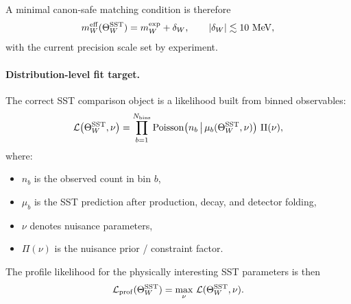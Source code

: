 \documentclass[11pt]{article}
\theoremstyle{definition}
\theoremstyle{plain}
\theoremstyle{remark}
\begin{document}
            A minimal canon-safe matching condition is therefore
            \begin{equation}
                m_W^{\rm eff}(\Theta_W^{\rm SST}) = m_W^{\rm exp} + \delta_W,
                \qquad
                |\delta_W| \lesssim 10~{\rm MeV},
                \label{eq:mw-match}
            \end{equation}
            with the current precision scale set by experiment.
    
        \paragraph{Distribution-level fit target.}
            The correct SST comparison object is a likelihood built from binned observables:
            \begin{equation}
                \mathcal{L}\bigl(\Theta_W^{\rm SST},\nu\bigr)
                =
                \prod_{b=1}^{N_{\rm bins}}
                    {\rm Poisson}\!\left(
                                       n_b \,\middle|\, \mu_b(\Theta_W^{\rm SST},\nu)
                \right)
                \,
                \Pi(\nu),
                \label{eq:sst-likelihood}
            \end{equation}
            where:
            \begin{itemize}
                \item $n_b$ is the observed count in bin $b$,
                \item $\mu_b$ is the SST prediction after production, decay, and detector folding,
                \item $\nu$ denotes nuisance parameters,
                \item $\Pi(\nu)$ is the nuisance prior / constraint factor.
            \end{itemize}
            The profile likelihood for the physically interesting SST parameters is then
            \begin{equation}
                \mathcal{L}_{\rm prof}(\Theta_W^{\rm SST})
                =
                \max_{\nu}\,
                \mathcal{L}(\Theta_W^{\rm SST},\nu).
                \label{eq:profile-like}
            \end{equation}
    
\end{document}
